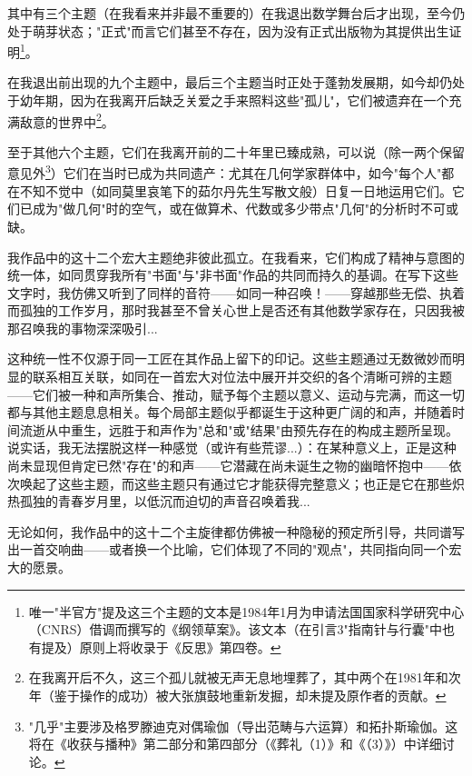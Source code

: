 其中有三个主题（在我看来并非最不重要的）在我退出数学舞台后才出现，至今仍处于萌芽状态；"正式"而言它们甚至不存在，因为没有正式出版物为其提供出生证明\footnote{唯一"半官方"提及这三个主题的文本是1984年1月为申请法国国家科学研究中心（CNRS）借调而撰写的《纲领草案》。该文本（在引言3"指南针与行囊"中也有提及）原则上将收录于《反思》第四卷。}。

在我退出前出现的九个主题中，最后三个主题当时正处于蓬勃发展期，如今却仍处于幼年期，因为在我离开后缺乏关爱之手来照料这些"孤儿"，它们被遗弃在一个充满敌意的世界中\footnote{在我离开后不久，这三个孤儿就被无声无息地埋葬了，其中两个在1981年和次年（鉴于操作的成功）被大张旗鼓地重新发掘，却未提及原作者的贡献。}。

至于其他六个主题，它们在我离开前的二十年里已臻成熟，可以说（除一两个保留意见外\footnote{"几乎"主要涉及格罗滕迪克对偶瑜伽（导出范畴与六运算）和拓扑斯瑜伽。这将在《收获与播种》第二部分和第四部分（《葬礼（1）》和《（3）》）中详细讨论。}）它们在当时已成为共同遗产：尤其在几何学家群体中，如今"每个人"都在不知不觉中（如同莫里哀笔下的茹尔丹先生写散文般）日复一日地运用它们。它们已成为"做几何"时的空气，或在做算术、代数或多少带点"几何"的分析时不可或缺。

我作品中的这十二个宏大主题绝非彼此孤立。在我看来，它们构成了精神与意图的统一体，如同贯穿我所有"书面"与"非书面"作品的共同而持久的基调。在写下这些文字时，我仿佛又听到了同样的音符——如同一种召唤！——穿越那些无偿、执着而孤独的工作岁月，那时我甚至不曾关心世上是否还有其他数学家存在，只因我被那召唤我的事物深深吸引...

这种统一性不仅源于同一工匠在其作品上留下的印记。这些主题通过无数微妙而明显的联系相互关联，如同在一首宏大对位法中展开并交织的各个清晰可辨的主题——它们被一种和声所集合、推动，赋予每个主题以意义、运动与完满，而这一切都与其他主题息息相关。每个局部主题似乎都诞生于这种更广阔的和声，并随着时间流逝从中重生，远胜于和声作为"总和"或"结果"由预先存在的构成主题所呈现。说实话，我无法摆脱这样一种感觉（或许有些荒谬...）：在某种意义上，正是这种尚未显现但肯定已然"存在"的和声——它潜藏在尚未诞生之物的幽暗怀抱中——依次唤起了这些主题，而这些主题只有通过它才能获得完整意义；也正是它在那些炽热孤独的青春岁月里，以低沉而迫切的声音召唤着我...

无论如何，我作品中的这十二个主旋律都仿佛被一种隐秘的预定所引导，共同谱写出一首交响曲——或者换一个比喻，它们体现了不同的"观点"，共同指向同一个宏大的愿景。

